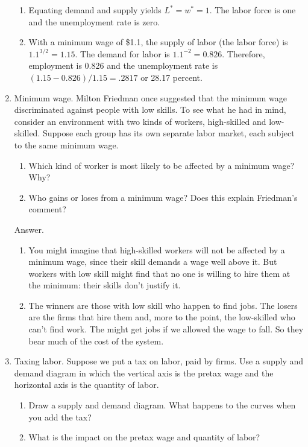 \begin{enumerate}
\begin{enumerate}
\item Equating demand and supply
yields
 $L^{*}=w^{*}=1$. The labor force is one and the
unemployment rate is zero.

\item With a minimum wage of \$1.1, the supply of labor (the labor
force) is $1.1^{{3}/{2}} = 1.15$. The demand for labor is
$1.1^{-2}=0.826$. Therefore, employment is 0.826 and the
unemployment rate is $(1.15-0.826)/{1.15}= .2817$ or 28.17 percent.
\end{enumerate}


\item Minimum wage.
Milton Friedman once suggested that the minimum wage discriminated against
people with low skills.
To see what he had in mind, consider an environment with two kinds of workers,
high-skilled and low-skilled.
Suppose each group has its own separate labor market,
each subject to the same minimum wage.
%
\begin{enumerate}
\item Which kind of worker is most likely to be affected by
a minimum wage?  Why?
\item Who gains or loses from a minimum wage?
Does this explain Friedman's comment?
\end{enumerate}

Answer.
\begin{enumerate}
\item You might imagine that high-skilled workers will not be affected by a minimum wage,
since their skill demands a wage well above it.
But workers with low skill might find that no one is willing
to hire them at the minimum:  their skills don't justify it.
\item The winners are those with low skill who happen to find jobs.
The losers are the firms that hire them and, more to the point,
the low-skilled who can't find work.
The might get jobs if we allowed the wage to fall.
So they bear much of the cost of the system.
\end{enumerate}

\item Taxing labor.  Suppose we put a tax on labor, paid by firms.
Use a supply and demand diagram in which the vertical axis is the pretax wage
and the horizontal axis is the quantity of labor.
\begin{enumerate}
\item Draw a supply and demand diagram.
What happens to the curves when you add the tax?
\item What is the impact on the pretax wage and quantity of labor?
\end{enumerate}


\end{enumerate}
